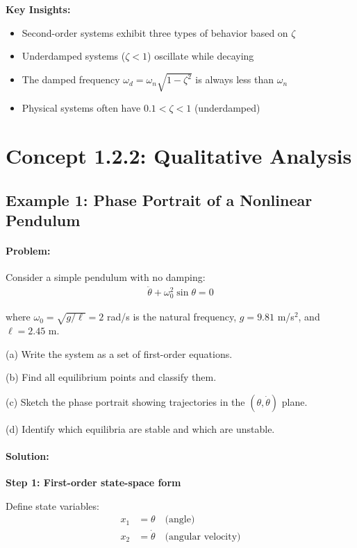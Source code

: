 \documentclass[11pt,a4paper]{article}
\begin{document}
\textbf{Key Insights:}
\begin{itemize}
\item Second-order systems exhibit three types of behavior based on $\zeta$
\item Underdamped systems ($\zeta < 1$) oscillate while decaying
\item The damped frequency $\omega_d = \omega_n\sqrt{1-\zeta^2}$ is always less than $\omega_n$
\item Physical systems often have $0.1 < \zeta < 1$ (underdamped)
\end{itemize}

\section{Concept 1.2.2: Qualitative Analysis}

\subsection{Example 1: Phase Portrait of a Nonlinear Pendulum}

\paragraph{Problem:} Consider a simple pendulum with no damping:
\begin{align}
\ddot{\theta} + \omega_0^2 \sin\theta = 0
\end{align}

where $\omega_0 = \sqrt{g/\ell} = 2$ rad/s is the natural frequency, $g = 9.81$ m/s$^2$, and $\ell = 2.45$ m.

(a) Write the system as a set of first-order equations.

(b) Find all equilibrium points and classify them.

(c) Sketch the phase portrait showing trajectories in the $(\theta, \dot{\theta})$ plane.

(d) Identify which equilibria are stable and which are unstable.

\paragraph{Solution:}

\textbf{Step 1: First-order state-space form}

Define state variables:
\begin{align}
x_1 &= \theta \quad \text{(angle)} \\
x_2 &= \dot{\theta} \quad \text{(angular velocity)}
\end{align}
\end{document}
